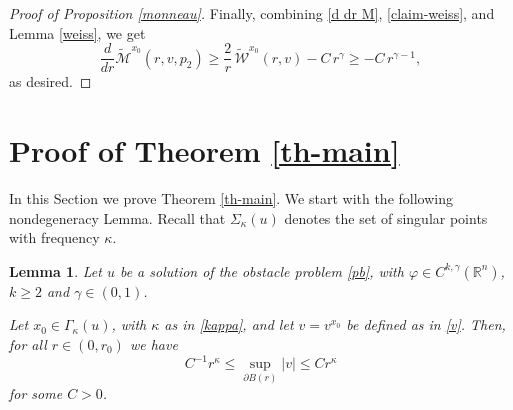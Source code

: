 \documentclass[11pt]{amsart}
\theoremstyle{plain}
\newtheorem{lemma}[thrm]{Lemma}
\numberwithin{equation}{section}
\begin{document}
\begin{proof}[Proof of Proposition \ref{monneau}]
Finally, combining \eqref{d dr M}, \eqref{claim-weiss}, and Lemma \ref{weiss}, we get
\[\frac{d}{dr}\tilde{\mathcal{M}}^{x_0}(r,v,p_2) \geq \frac{2}{r}\,\tilde{\mathcal{W}}^{x_0}(r,v)-C\,r^{\gamma}\geq -C\,r^{\gamma-1},\]
as desired.
\end{proof}

\section{Proof of Theorem \ref{th-main}}
\label{sec8}

In this Section we prove Theorem \ref{th-main}.
We start with the following nondegeneracy Lemma.
Recall that $\Sigma_\kappa(u)$ denotes the set of singular points with frequency $\kappa$.

\begin{lemma}\label{nondegeneracy}
Let $u$ be a solution of the obstacle problem \eqref{pb}, with $\varphi\in C^{k,\gamma}({\mathbb R}^n)$,  $k\geq2$ and $\gamma\in(0,1)$.

Let $x_0\in \Gamma_\kappa(u)$, with $\kappa$ as in \eqref{kappa}, and let $v=v^{x_0}$ be defined as in \eqref{v}.
Then, for all $r\in(0,r_0)$ we have
\[C^{-1}r^\kappa\leq \sup_{\partial{B(r)}}|v|\leq Cr^\kappa\]
for some $C>0$.
\end{lemma}
\end{document}

